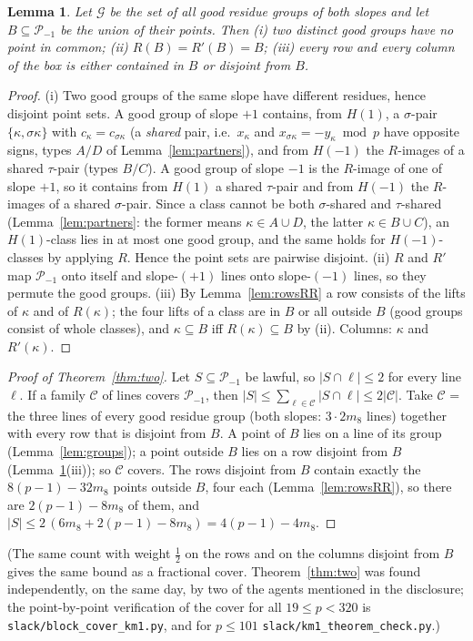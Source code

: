\documentclass[11pt]{article}
\newtheorem{lemma}[theorem]{Lemma}
\theoremstyle{remark}
\newcommand{\Pset}{\mathcal{P}}
\begin{document}
\begin{lemma}\label{lem:closure}
Let $\mathcal G$ be the set of all good residue groups of both slopes and let $B\subseteq\Pset_{-1}$ be the union of their points.
Then (i) two distinct good groups have no point in common; (ii) $R(B)=R'(B)=B$; (iii) every row and every column of the box is either
contained in $B$ or disjoint from $B$.
\end{lemma}
\begin{proof}
(i) Two good groups of the same slope have different residues, hence disjoint point sets.  A good group of slope $+1$ contains, from
$H(1)$, a $\sigma$-pair $\{\kappa,\sigma\kappa\}$ with $c_\kappa=c_{\sigma\kappa}$ (a \emph{shared} pair, i.e.\ $x_\kappa$ and $x_{\sigma\kappa}=-y_\kappa\bmod p$
have opposite signs, types $A/D$ of Lemma~\ref{lem:partners}), and from $H(-1)$ the $R$-images of a shared $\tau$-pair (types $B/C$).
A good group of slope $-1$ is the $R$-image of one of slope $+1$, so it contains from $H(1)$ a shared $\tau$-pair and from $H(-1)$ the
$R$-images of a shared $\sigma$-pair.  Since a class cannot be both $\sigma$-shared and $\tau$-shared (Lemma~\ref{lem:partners}: the former
means $\kappa\in A\cup D$, the latter $\kappa\in B\cup C$), an $H(1)$-class lies in at most one good group, and the same holds for
$H(-1)$-classes by applying $R$.  Hence the point sets are pairwise disjoint.
(ii) $R$ and $R'$ map $\Pset_{-1}$ onto itself and slope-$(+1)$ lines onto slope-$(-1)$ lines, so they permute the good groups.
(iii) By Lemma~\ref{lem:rowsRR} a row consists of the lifts of $\kappa$ and of $R(\kappa)$; the four lifts of a class are in $B$ or all
outside $B$ (good groups consist of whole classes), and $\kappa\subseteq B$ iff $R(\kappa)\subseteq B$ by (ii).  Columns: $\kappa$ and $R'(\kappa)$.
\end{proof}

\begin{proof}[Proof of Theorem~\ref{thm:two}]
Let $S\subseteq\Pset_{-1}$ be lawful, so $|S\cap\ell|\le2$ for every line $\ell$.  If a family $\mathcal C$ of lines covers
$\Pset_{-1}$, then $|S|\le\sum_{\ell\in\mathcal C}|S\cap\ell|\le2|\mathcal C|$.  Take $\mathcal C$ = the three lines of every good residue
group (both slopes: $3\cdot2m_8$ lines) together with every row that is disjoint from $B$.  A point of $B$ lies on a line of its group
(Lemma~\ref{lem:groups}); a point outside $B$ lies on a row disjoint from $B$ (Lemma~\ref{lem:closure}(iii)); so $\mathcal C$ covers.
The rows disjoint from $B$ contain exactly the $8(p-1)-32m_8$ points outside $B$, four each (Lemma~\ref{lem:rowsRR}), so there are
$2(p-1)-8m_8$ of them, and $|S|\le2\,(6m_8+2(p-1)-8m_8)=4(p-1)-4m_8$.
\end{proof}
(The same count with weight $\tfrac12$ on the rows and on the columns disjoint from $B$ gives the same bound as a fractional cover.
Theorem~\ref{thm:two} was found independently, on the same day, by two of the agents mentioned in the disclosure; the point-by-point
verification of the cover for all $19\le p<320$ is \texttt{slack/block\_cover\_km1.py}, and for $p\le101$ \texttt{slack/km1\_theorem\_check.py}.)
\end{document}
